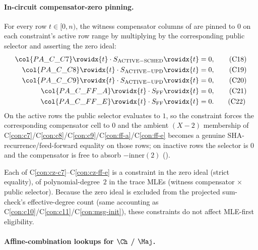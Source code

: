 \paragraph{In-circuit compensator-zero pinning.}

For every row $t \in [0, n)$, the witness compensator columns of
 are pinned to $0$ on each constraint's active
row range by multiplying by the corresponding public selector and
asserting the zero ideal:
\begin{align}
\col{PA\_C\_C7}\rowidx{t}    \cdot S_{\mathrm{ACTIVE-SCHED}}\rowidx{t} &= 0, \tag{C18}\label{con:cz-c7}\\
\col{PA\_C\_C8}\rowidx{t}    \cdot S_{\mathrm{ACTIVE-UPD}}\rowidx{t}   &= 0, \tag{C19}\label{con:cz-c8}\\
\col{PA\_C\_C9}\rowidx{t}    \cdot S_{\mathrm{ACTIVE-UPD}}\rowidx{t}   &= 0, \tag{C20}\label{con:cz-c9}\\
\col{PA\_C\_FF\_A}\rowidx{t} \cdot S_{\mathrm{FF}}\rowidx{t}           &= 0, \tag{C21}\label{con:cz-ff-a}\\
\col{PA\_C\_FF\_E}\rowidx{t} \cdot S_{\mathrm{FF}}\rowidx{t}           &= 0. \tag{C22}\label{con:cz-ff-e}
\end{align}
On the active rows the public selector evaluates to $1$, so the
constraint forces the corresponding compensator cell to $0$ and the
ambient $(X-2)$ membership of C\ref{con:c7}/C\ref{con:c8}/C\ref{con:c9}/C\ref{con:ff-a}/C\ref{con:ff-e}
becomes a genuine SHA-recurrence/feed-forward equality on those
rows; on inactive rows the selector is $0$ and the compensator is
free to absorb $-\mathrm{inner}(2)$ ().

Each of C\ref{con:cz-c7}--C\ref{con:cz-ff-e} is a constraint in the
zero ideal (strict equality), of polynomial-degree~$2$ in the trace
MLEs (witness compensator $\times$ public selector). Because the
zero ideal is excluded from the projected sum-check's
effective-degree count (same accounting as C\ref{con:c10}/C\ref{con:c11}/C\ref{con:msg-init}),
these constraints do not affect MLE-first eligibility.

\paragraph{Affine-combination lookups for $\Ch$ / $\Maj$.}

